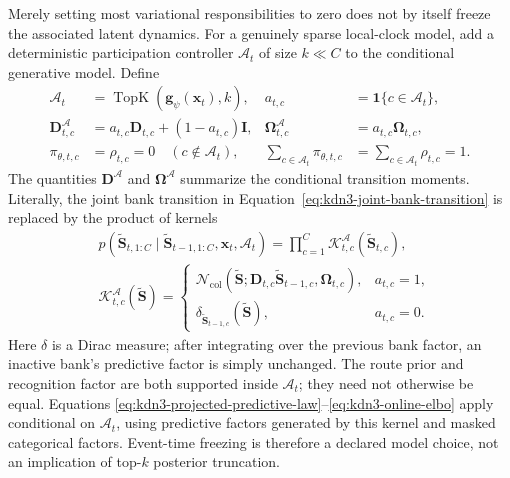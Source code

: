\documentclass[11pt]{article}
\newcommand{\ve}[1]{\boldsymbol{#1}}
\newcommand{\Normal}{\mathcal{N}}
\begin{document}
Merely setting most variational responsibilities to zero does not by itself freeze the associated
latent dynamics.  For a genuinely sparse local-clock model, add a deterministic participation
controller $\mathcal{A}_t$ of size $k\ll C$ to the conditional generative model.  Define
\begin{equation}
\begin{aligned}
  \mathcal{A}_t
  &=\operatorname{TopK}(\ve{g}_{\psi}(\ve{x}_t),k),
  &a_{t,c}&=\mathbf{1}\{c\in\mathcal{A}_t\},
  \\
  \ve{D}^{\mathcal{A}}_{t,c}
  &=a_{t,c}\ve{D}_{t,c}+(1-a_{t,c})\ve{I},
  &
  \ve{\Omega}^{\mathcal{A}}_{t,c}
  &=a_{t,c}\ve{\Omega}_{t,c},
  \\
  \pi_{\theta,t,c}&=\rho_{t,c}=0\quad(c\notin\mathcal{A}_t),
  &
  \sum_{c\in\mathcal{A}_t}\pi_{\theta,t,c}
  &=\sum_{c\in\mathcal{A}_t}\rho_{t,c}=1.
\end{aligned}
  \label{eq:kdn3-topk-router}
\end{equation}
The quantities $\ve{D}^{\mathcal{A}}$ and $\ve{\Omega}^{\mathcal{A}}$ summarize the conditional
transition moments.  Literally, the joint bank transition in
Equation~\eqref{eq:kdn3-joint-bank-transition} is replaced by the product of kernels
\begin{equation}
\begin{aligned}
  &p(\widetilde{\ve{S}}_{t,1:C}
      \mid\widetilde{\ve{S}}_{t-1,1:C},\ve{x}_t,\mathcal{A}_t)
    =\prod_{c=1}^{C}
      \mathcal{K}^{\mathcal{A}}_{t,c}(\widetilde{\ve{S}}_{t,c}),
  \\
  &\mathcal{K}^{\mathcal{A}}_{t,c}(\widetilde{\ve{S}})
  =\begin{cases}
    \Normal_{\mathrm{col}}\!\left(
      \widetilde{\ve{S}};
      \ve{D}_{t,c}\widetilde{\ve{S}}_{t-1,c},\ve{\Omega}_{t,c}
    \right), & a_{t,c}=1,\\
    \delta_{\widetilde{\ve{S}}_{t-1,c}}(\widetilde{\ve{S}}),
      & a_{t,c}=0.
  \end{cases}
\end{aligned}
  \label{eq:kdn3-participation-transition}
\end{equation}
Here $\delta$ is a Dirac measure; after integrating over the previous bank factor, an inactive
bank's predictive factor is simply unchanged.  The route prior and recognition factor are both
supported inside $\mathcal{A}_t$; they need not otherwise be equal.  Equations
\eqref{eq:kdn3-projected-predictive-law}--\eqref{eq:kdn3-online-elbo} apply conditional on
$\mathcal{A}_t$, using predictive factors generated by this kernel and masked categorical factors.
Event-time freezing is therefore a declared model choice, not an implication of top-$k$ posterior
truncation.
\end{document}
